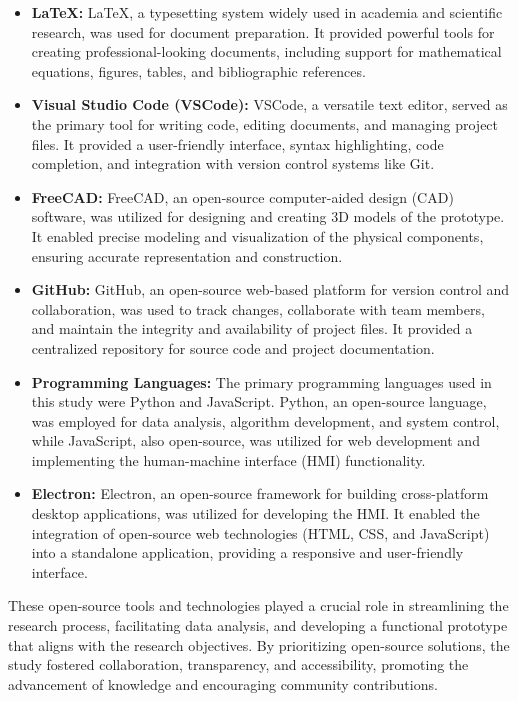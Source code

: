 \documentclass[../main.tex]{subfiles}
\begin{document}
\begin{itemize}
    \item \textbf{LaTeX:} LaTeX, a typesetting system widely used in academia and scientific research, was used for document preparation. It provided powerful tools for creating professional-looking documents, including support for mathematical equations, figures, tables, and bibliographic references.
    
    \item \textbf{Visual Studio Code (VSCode):} VSCode, a versatile text editor, served as the primary tool for writing code, editing documents, and managing project files. It provided a user-friendly interface, syntax highlighting, code completion, and integration with version control systems like Git.
    
    \item \textbf{FreeCAD:} FreeCAD, an open-source computer-aided design (CAD) software, was utilized for designing and creating 3D models of the prototype. It enabled precise modeling and visualization of the physical components, ensuring accurate representation and construction.
    
    \item \textbf{GitHub:} GitHub, an open-source web-based platform for version control and collaboration, was used to track changes, collaborate with team members, and maintain the integrity and availability of project files. It provided a centralized repository for source code and project documentation.
    
    \item \textbf{Programming Languages:} The primary programming languages used in this study were Python and JavaScript. Python, an open-source language, was employed for data analysis, algorithm development, and system control, while JavaScript, also open-source, was utilized for web development and implementing the human-machine interface (HMI) functionality.
    
    \item \textbf{Electron:} Electron, an open-source framework for building cross-platform desktop applications, was utilized for developing the HMI. It enabled the integration of open-source web technologies (HTML, CSS, and JavaScript) into a standalone application, providing a responsive and user-friendly interface.
\end{itemize}

These open-source tools and technologies played a crucial role in streamlining the research process, facilitating data analysis, and developing a functional prototype that aligns with the research objectives. By prioritizing open-source solutions, the study fostered collaboration, transparency, and accessibility, promoting the advancement of knowledge and encouraging community contributions.
\end{document}
